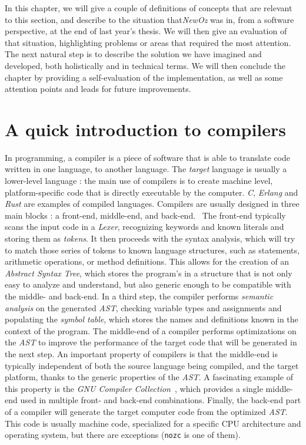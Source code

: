 
In this chapter, we will give a couple of definitions of concepts that are relevant to this section, and describe to the situation that\textit{NewOz} was in, from a software perspective, at the end of last year's thesis.
We will then give an evaluation of that situation, highlighting problems or areas that required the most attention.
The next natural step is to describe the solution we have imagined and developed, both holistically and in technical terms.
We will then conclude the chapter by providing a self-evaluation of the implementation, as well as some attention points and leads for future improvements.

\section{A quick introduction to compilers}\label{sec:ch3-compilers}
In programming, a compiler is a piece of software that is able to translate code written in one language, to another language.
The \textit{target} language is usually a lower-level language : the main use of compilers is to create machine level, platform-specific code that is directly executable by the computer.
\textit{C}, \textit{Erlang} and \textit{Rust} are examples of compiled languages.
Compilers are usually designed in three main blocks : a front-end, middle-end, and back-end.~\cite{wikiCompiler}\newline
The front-end typically scans the input code in a \textit{Lexer}, recognizing keywords and known literals and storing them as \textit{tokens}.
It then proceeds with the syntax analysis, which will try to match those series of tokens to known language structures, such as statements, arithmetic operations, or method definitions.
This allows for the creation of an \textit{Abstract Syntax Tree}, which stores the program's in a structure that is not only easy to analyze and understand, but also generic enough to be compatible with the middle- and back-end.
In a third step, the compiler performs \textit{semantic analysis} on the generated \textit{AST}, checking variable types and assignments and populating the \textit{symbol table}, which stores the names and definitions known in the context of the program.\newline
The middle-end of a compiler performs optimizations on the \textit{AST} to improve the performance of the target code that will be generated in the next step.
An important property of compilers is that the middle-end is typically independent of both the source language being compiled, and the target platform, thanks to the generic properties of the \textit{AST}.
A fascinating example of this property is the \textit{GNU Compiler Collection}~\cite{gcc}, which provides a single middle-end used in multiple front- and back-end combinations.\newline
Finally, the back-end part of a compiler will generate the target computer code from the optimized \textit{AST}.
This code is usually machine code, specialized for a specific CPU architecture and operating system, but there are exceptions (\texttt{nozc} is one of them).

